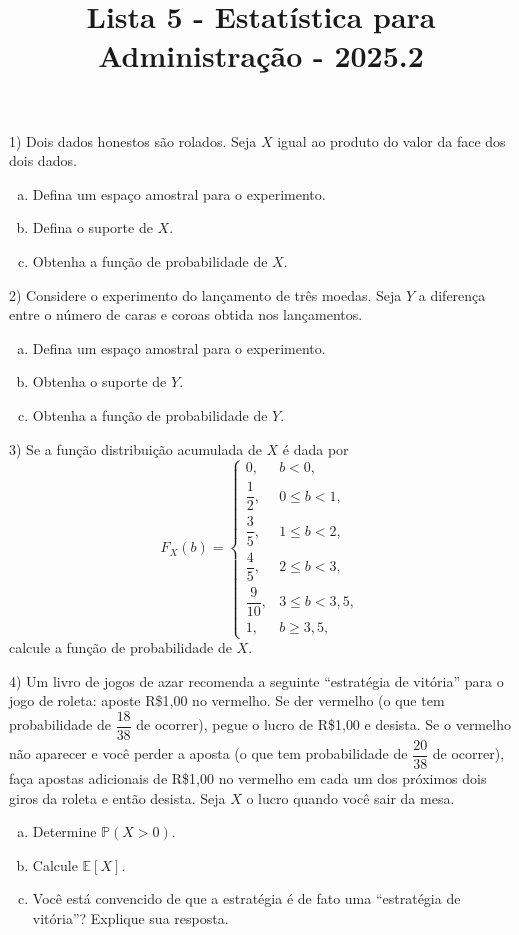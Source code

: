 \documentclass[12pt]{article}
\title{Lista 5 - Estatística para Administração - 2025.2}
\begin{document}
\date{}
\maketitle

1) Dois dados honestos são rolados. Seja $X$ igual ao produto do valor da face dos dois dados. 

\begin{enumerate}[a)]
    \item Defina um espaço amostral para o experimento. 
    \item Defina o suporte de $X$. 
    \item Obtenha a função de probabilidade de $X$.
\end{enumerate}

2) Considere o experimento do lançamento de três moedas. Seja $Y$ a diferença entre o número de caras e coroas obtida nos lançamentos. 

\begin{enumerate}[a)]
    \item Defina um espaço amostral para o experimento. 
    \item Obtenha o suporte de $Y$.
    \item Obtenha a função de probabilidade de $Y$. 
\end{enumerate}
    

3) Se a função distribuição acumulada de $X$ é dada por
\[
F_X(b) =
\begin{cases}
0, & b < 0, \\[6pt]
\dfrac{1}{2}, & 0 \leq b < 1, \\[6pt]
\dfrac{3}{5}, & 1 \leq b < 2, \\[6pt]
\dfrac{4}{5}, & 2 \leq b < 3, \\[6pt]
\dfrac{9}{10}, & 3 \leq b < 3{,}5, \\[6pt]
1, & b \geq 3{,}5,
\end{cases}
\]
calcule a função de probabilidade de $X$.

4) Um livro de jogos de azar recomenda a seguinte ``estratégia de vitória'' para o jogo de roleta: aposte R\$1{,}00 no vermelho. 
Se der vermelho (o que tem probabilidade de $\dfrac{18}{38}$ de ocorrer), pegue o lucro de R\$1{,}00 e desista.
 Se o vermelho não aparecer e você perder a aposta (o que tem probabilidade de $\dfrac{20}{38}$ de ocorrer),
  faça apostas adicionais de R\$1{,}00 no vermelho em cada um dos próximos dois giros da roleta e então desista. 
  Seja $X$ o lucro quando você sair da mesa.

\begin{enumerate}[(a)]
    \item Determine $\mathds{P}(X > 0)$.
    \item Calcule $\mathds{E}[X]$.
    \item Você está convencido de que a estratégia é de fato uma ``estratégia de vitória''? Explique sua resposta.
\end{enumerate}
 
\end{document}
